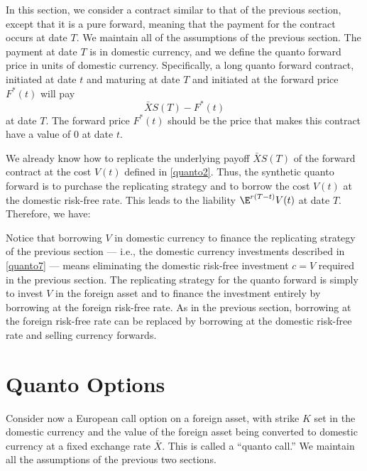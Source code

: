 In this section, we consider a contract similar to that of the previous section, except that it is a pure forward, meaning that the payment for the contract occurs at date $T$.  We maintain all of the assumptions of the previous section.  The payment at date $T$ is in domestic currency, and we define the quanto forward price in units of domestic currency.  Specifically, a long quanto forward contract,  initiated at date $t$ and maturing at date $T$ and initiated at the forward price $F^*(t)$ will pay 
$$\bar{X}S(T)-F^*(t)$$ 
at date $T$.  The forward price $F^*(t)$ should be the price that makes this contract have a value of 0 at date $t$.  

We already know how to replicate the underlying payoff $\bar{X}S(T)$ of the forward contract at the cost $V(t)$ defined in \eqref{quanto2}.  Thus, the synthetic quanto forward is to purchase the replicating strategy and to borrow the cost $V(t)$ at the domestic risk-free rate.  This leads to the liability $\E^{r(T-t)}V(t)$ at date $T$.  Therefore, we have:

Notice that borrowing $V$ in domestic currency to finance the replicating strategy of the previous section --- i.e., the domestic currency investments described in \eqref{quanto7} --- means eliminating the domestic risk-free investment $c=V$ required in the previous section.  The replicating strategy for the quanto forward is simply to invest $V$ in the foreign asset and to finance the investment entirely by borrowing at the foreign risk-free rate.  As in the previous section, borrowing at the foreign risk-free rate can be replaced by borrowing at the domestic risk-free rate and selling currency forwards.  

\section{Quanto Options}\label{s_quantooptions}

Consider now a European call option on a foreign asset, with strike $K$ set in the domestic currency and the value of the foreign asset being converted to domestic currency at a fixed exchange rate $\bar{X}$.   This is called a ``quanto call.''  We maintain all the assumptions of the previous two sections.

